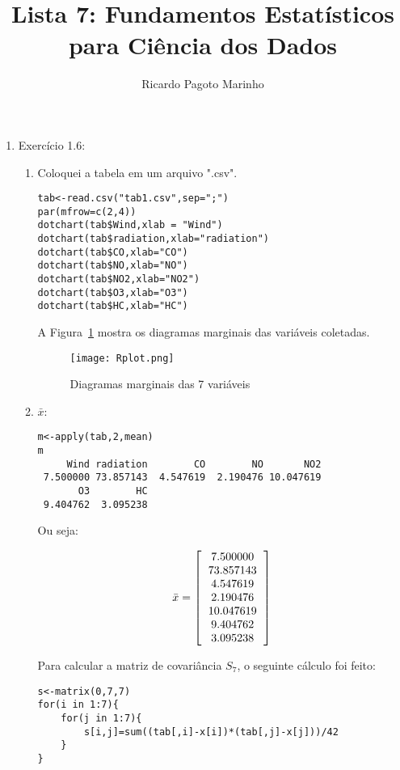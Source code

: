 \documentclass[11pt,a4paper]{book}
\title{Lista 7: Fundamentos Estatísticos para Ciência dos Dados}
\author{Ricardo Pagoto Marinho}
\begin{document}
\maketitle
	\begin{enumerate}
		\item Exercício 1.6:
		\begin{enumerate}[label=\alph*)]
			\item Coloquei a tabela em um arquivo ".csv".
			\begin{lstlisting}	
tab<-read.csv("tab1.csv",sep=";")
par(mfrow=c(2,4))
dotchart(tab$Wind,xlab = "Wind")
dotchart(tab$radiation,xlab="radiation")
dotchart(tab$CO,xlab="CO")
dotchart(tab$NO,xlab="NO")
dotchart(tab$NO2,xlab="NO2")
dotchart(tab$O3,xlab="O3")
dotchart(tab$HC,xlab="HC")
			\end{lstlisting}
		
			A Figura~\ref{fig:fig1} mostra os diagramas marginais das variáveis coletadas.
		
			\begin{figure}[h]
				\centering
				\texttt{[image: Rplot.png]}
				\caption{Diagramas marginais das 7 variáveis}
				\label{fig:fig1}
			\end{figure}
			
			\item $\bar{x}$:
			\begin{lstlisting}
m<-apply(tab,2,mean)
m
     Wind radiation        CO        NO       NO2 
 7.500000 73.857143  4.547619  2.190476 10.047619 
       O3        HC 
 9.404762  3.095238 
			\end{lstlisting}
			
			Ou seja:
			
			\begin{eqnarray*}
				\bar{x}=\left[
				\begin{tabular}{c}
					7.500000\\
					73.857143\\
					4.547619\\
					2.190476\\
					10.047619\\
					9.404762\\
					3.095238
				\end{tabular}
				\right]
			\end{eqnarray*}
			
			Para calcular a matriz de covariância $S_7$, o seguinte cálculo foi feito:
			\begin{lstlisting}
s<-matrix(0,7,7)
for(i in 1:7){
    for(j in 1:7){
        s[i,j]=sum((tab[,i]-x[i])*(tab[,j]-x[j]))/42
    }
}
			\end{lstlisting}
			

\end{enumerate}
\end{enumerate}
\end{document}
